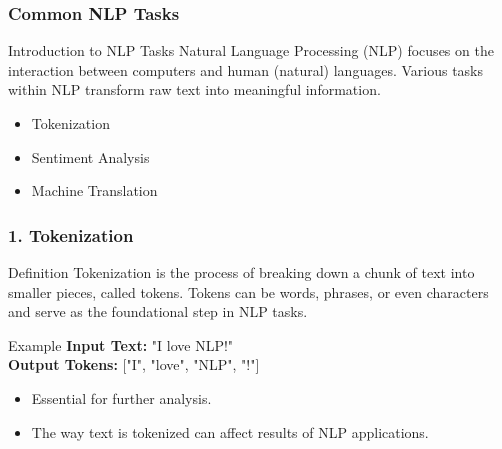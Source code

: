 \documentclass{beamer}
\begin{document}
\begin{frame}[fragile]
    \frametitle{Common NLP Tasks}
    \begin{block}{Introduction to NLP Tasks}
        Natural Language Processing (NLP) focuses on the interaction between computers and human (natural) languages.
        Various tasks within NLP transform raw text into meaningful information.
    \end{block}
    \begin{itemize}
        \item Tokenization
        \item Sentiment Analysis
        \item Machine Translation
    \end{itemize}
\end{frame}

\begin{frame}[fragile]
    \frametitle{1. Tokenization}
    \begin{block}{Definition}
        Tokenization is the process of breaking down a chunk of text into smaller pieces, called tokens.
        Tokens can be words, phrases, or even characters and serve as the foundational step in NLP tasks.
    \end{block}
    
    \begin{exampleblock}{Example}
        \textbf{Input Text:} "I love NLP!" \\
        \textbf{Output Tokens:} ["I", "love", "NLP", "!"]
    \end{exampleblock}
    
    \begin{itemize}
        \item Essential for further analysis.
        \item The way text is tokenized can affect results of NLP applications.
    \end{itemize}
\end{frame}
\end{document}
